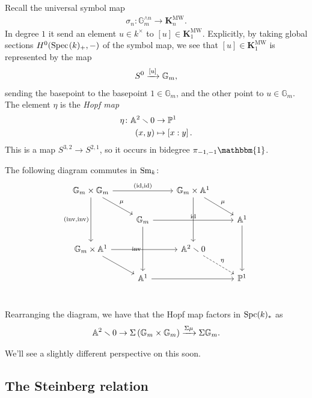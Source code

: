 \documentclass[11pt,openany]{book}
\let\smashprod\wedge
\providecommand{\KMW}{\mathbf{K}^\mathrm{MW}}
\begin{document}
Recall the universal symbol map
\begin{align*}
    \sigma_n \colon \mathbb{G}_m^{\smashprod n} \to \KMW_n.
\end{align*}
In degree $1$ it send an element $u \in k^\times$ to $[u]\in \KMW_1$. Explicitly, by taking global sections $H^0(\text{Spec}\hspace{0.1em}(k)_+,-)$ of the symbol map, we see that $[u]\in \KMW_1$ is represented by the map
\begin{align*}
    S^0 \xrightarrow{[u]} \mathbb{G}_m,
\end{align*}
sending the basepoint to the basepoint $1\in \mathbb{G}_m$, and the other point to $u \in \mathbb{G}_m$. The element $\eta$ is the \textit{Hopf map}
\begin{align*}
    \eta \colon \mathbb{A}^2\smallsetminus 0 &\to \mathbb{P}^1 \\
    (x,y) &\mapsto \left[ x:y \right].
\end{align*}
%
This is a map $S^{3,2} \to S^{2,1}$, so it occurs in bidegree $\pi_{-1,-1} \mathbbm{1}$.

\begin{proposition} The following diagram commutes in $\mathrm{Sm}_k$:
\[\begin{tikzcd}
    \mathbb{G}_m \times \mathbb{G}_m\ar[dr,"\mu"]\ar[rr,"{(\id,\id)}"]\ar[dd,"{(\inv,\inv)}" left] &  & \mathbb{G}_m \times \A^1\ar[dr,"\mu"]\ar[dd] & \\
     & \mathbb{G}_m\ar[dd,"\inv" left]\ar[rr,"\id"] &  & \A^1\ar[dd]\\
    \mathbb{G}_m \times \A^1\ar[dr]\ar[rr] &  & \A^2\minus 0\ar[dr,dashed,"\eta"] & \\
     & \A^1\ar[rr] &  & \P^1\\
\end{tikzcd} \]
\end{proposition}

\begin{corollary} Rearranging the diagram, we have that the Hopf map factors in $\mathrm{Spc}(k)_\ast$ as
\begin{equation}\label{eqn:hopf-factors}
\begin{aligned}
    \mathbb{A}^2 \smallsetminus 0 \to \Sigma \left( \mathbb{G}_m \times \mathbb{G}_m \right) \xrightarrow{\Sigma \mu} \Sigma \mathbb{G}_m.
\end{aligned}
\end{equation}
\end{corollary}

We'll see a slightly different perspective on this soon.

\subsection{The Steinberg relation}
\end{document}
